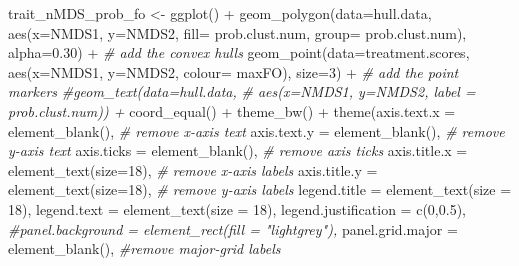 \documentclass[
]{article}
\newenvironment{Shaded}{\begin{snugshade}}{\end{snugshade}}
\newcommand{\AttributeTok}[1]{\textcolor[rgb]{0.77,0.63,0.00}{#1}}
\newcommand{\CommentTok}[1]{\textcolor[rgb]{0.56,0.35,0.01}{\textit{#1}}}
\newcommand{\DecValTok}[1]{\textcolor[rgb]{0.00,0.00,0.81}{#1}}
\newcommand{\FloatTok}[1]{\textcolor[rgb]{0.00,0.00,0.81}{#1}}
\newcommand{\FunctionTok}[1]{\textcolor[rgb]{0.00,0.00,0.00}{#1}}
\newcommand{\NormalTok}[1]{#1}
\newcommand{\OtherTok}[1]{\textcolor[rgb]{0.56,0.35,0.01}{#1}}
\newcommand{\SpecialCharTok}[1]{\textcolor[rgb]{0.00,0.00,0.00}{#1}}
\begin{document}
\begin{Shaded}
\begin{Highlighting}[]
\NormalTok{trait\_nMDS\_prob\_fo }\OtherTok{\textless{}{-}} \FunctionTok{ggplot}\NormalTok{() }\SpecialCharTok{+} 
  \FunctionTok{geom\_polygon}\NormalTok{(}\AttributeTok{data=}\NormalTok{hull.data, }
               \FunctionTok{aes}\NormalTok{(}\AttributeTok{x=}\NormalTok{NMDS1, }\AttributeTok{y=}\NormalTok{NMDS2, }
                   \AttributeTok{fill=}\NormalTok{ prob.clust.num, }
                   \AttributeTok{group=}\NormalTok{ prob.clust.num), }
               \AttributeTok{alpha=}\FloatTok{0.30}\NormalTok{) }\SpecialCharTok{+} \CommentTok{\# add the convex hulls}
  \FunctionTok{geom\_point}\NormalTok{(}\AttributeTok{data=}\NormalTok{treatment.scores, }
             \FunctionTok{aes}\NormalTok{(}\AttributeTok{x=}\NormalTok{NMDS1, }\AttributeTok{y=}\NormalTok{NMDS2, }\AttributeTok{colour=}\NormalTok{ maxFO), }
             \AttributeTok{size=}\DecValTok{3}\NormalTok{) }\SpecialCharTok{+} \CommentTok{\# add the point markers}
  \CommentTok{\#geom\_text(data=hull.data, }
  \CommentTok{\#          aes(x=NMDS1, y=NMDS2, label = prob.clust.num)) +}
  \FunctionTok{coord\_equal}\NormalTok{() }\SpecialCharTok{+}
  \FunctionTok{theme\_bw}\NormalTok{()  }\SpecialCharTok{+}
  \FunctionTok{theme}\NormalTok{(}\AttributeTok{axis.text.x =} \FunctionTok{element\_blank}\NormalTok{(),  }\CommentTok{\# remove x{-}axis text}
        \AttributeTok{axis.text.y =} \FunctionTok{element\_blank}\NormalTok{(), }\CommentTok{\# remove y{-}axis text}
        \AttributeTok{axis.ticks =} \FunctionTok{element\_blank}\NormalTok{(),  }\CommentTok{\# remove axis ticks}
        \AttributeTok{axis.title.x =} \FunctionTok{element\_text}\NormalTok{(}\AttributeTok{size=}\DecValTok{18}\NormalTok{), }\CommentTok{\# remove x{-}axis labels}
        \AttributeTok{axis.title.y =} \FunctionTok{element\_text}\NormalTok{(}\AttributeTok{size=}\DecValTok{18}\NormalTok{), }\CommentTok{\# remove y{-}axis labels}
        \AttributeTok{legend.title =} \FunctionTok{element\_text}\NormalTok{(}\AttributeTok{size =} \DecValTok{18}\NormalTok{), }
        \AttributeTok{legend.text =} \FunctionTok{element\_text}\NormalTok{(}\AttributeTok{size =} \DecValTok{18}\NormalTok{),}
        \AttributeTok{legend.justification =} \FunctionTok{c}\NormalTok{(}\DecValTok{0}\NormalTok{,}\FloatTok{0.5}\NormalTok{),}
        \CommentTok{\#panel.background = element\_rect(fill = "lightgrey"), }
        \AttributeTok{panel.grid.major =} \FunctionTok{element\_blank}\NormalTok{(),  }\CommentTok{\#remove major{-}grid labels}

\end{Highlighting}
\end{Shaded}
\end{document}
